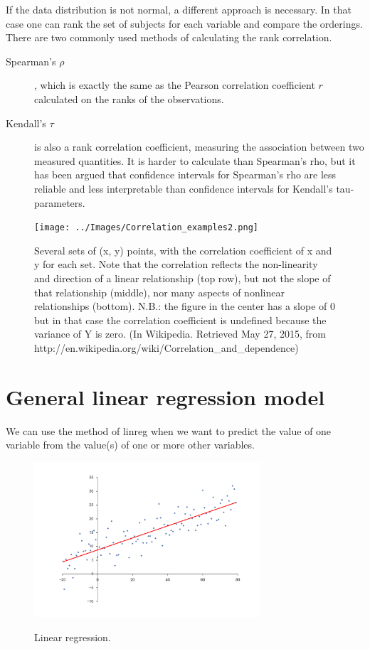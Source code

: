 If the data distribution is not normal, a different approach is necessary. In that case one can rank the set of subjects for each variable and compare the orderings. There are two commonly used methods of calculating the rank correlation. 

\begin{description}
  \item[Spearman's $\rho$], which is exactly the same as the Pearson correlation coefficient $r$ calculated on the ranks of the observations.
  \item[Kendall's $\tau$] is also a rank correlation coefficient, measuring the association between two measured quantities. It is harder to calculate than Spearman's rho, but it has been argued that confidence intervals for Spearman’s rho are less reliable and less interpretable than confidence intervals for Kendall’s tau-parameters.
\end{description}

\begin{figure}
  \centering
  \texttt{[image: ../Images/Correlation\_examples2.png]}\\
  \caption{Several sets of (x, y) points, with the correlation coefficient of x and y for each set. Note that the correlation reflects the non-linearity and direction of a linear relationship (top row), but not the slope of that relationship (middle), nor many aspects of nonlinear relationships (bottom). N.B.: the figure in the center has a slope of 0 but in that case the correlation coefficient is undefined because the variance of Y is zero. (In Wikipedia. Retrieved May 27, 2015, from http://en.wikipedia.org/wiki/Correlation\_and\_dependence)}\label{fig:correlation}
\end{figure}

\section{General linear regression model}

We can use the method of \gls{linreg} when we want to predict the value of one variable from the value(s) of one or more other variables.

\begin{figure}
  \centering
  \includegraphics[width=0.75\textwidth]{../Images/Linear_regression.png}\\
  \caption{Linear regression.}\label{fig:regression}
\end{figure}

